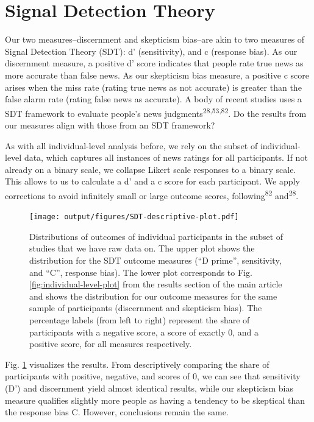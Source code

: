 \documentclass[
  doc,floatsintext]{apa6}
\begin{document}
\section{Signal Detection Theory}\label{signal-detection-theory}

Our two measures--discernment and skepticism bias--are akin to two measures of Signal Detection Theory (SDT): d' (sensitivity), and c (response bias). As our discernment measure, a positive d' score indicates that people rate true news as more accurate than false news. As our skepticism bias measure, a positive c score arises when the miss rate (rating true news as not accurate) is greater than the false alarm rate (rating false news as accurate). A body of recent studies uses a SDT framework to evaluate people's news judgments\textsuperscript{28,53,82}. Do the results from our measures align with those from an SDT framework?

As with all individual-level analysis before, we rely on the subset of individual-level data, which captures all instances of news ratings for all participants. If not already on a binary scale, we collapse Likert scale responses to a binary scale. This allows to us to calculate a d' and a c score for each participant. We apply corrections to avoid infinitely small or large outcome scores, following\textsuperscript{82} and\textsuperscript{28}.



\begin{figure}
\centering
\texttt{[image: output/figures/SDT-descriptive-plot.pdf]}
\caption{\label{fig:SDT-descriptive-plot}Distributions of outcomes of individual participants in the subset of studies that we have raw data on. The upper plot shows the distribution for the SDT outcome measures (``D prime'', sensitivity, and ``C'', response bias). The lower plot corresponds to Fig. \ref{fig:individual-level-plot} from the results section of the main article and shows the distribution for our outcome measures for the same sample of participants (discernment and skepticism bias). The percentage labels (from left to right) represent the share of participants with a negative score, a score of exactly 0, and a positive score, for all measures respectively.}
\end{figure}

Fig. \ref{fig:SDT-descriptive-plot} visualizes the results. From descriptively comparing the share of participants with positive, negative, and scores of 0, we can see that sensitivity (D') and discernment yield almost identical results, while our skepticism bias measure qualifies slightly more people as having a tendency to be skeptical than the response bias C. However, conclusions remain the same.
\end{document}
